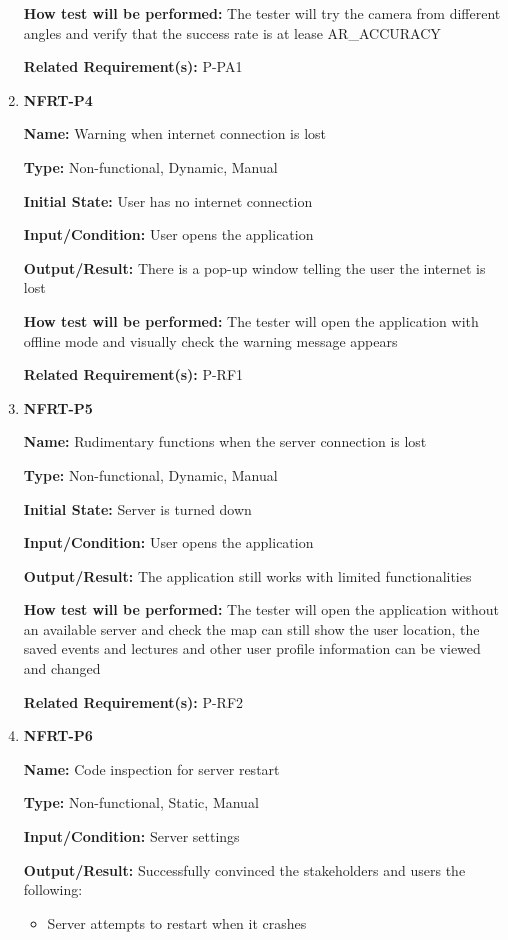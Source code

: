 \documentclass[12pt, titlepage]{article}
\begin{document}
\begin{enumerate}
\textbf{How test will be performed:} The tester will try the camera from different angles and verify that the success rate is at lease AR\_ACCURACY

\textbf{Related Requirement(s):} P-PA1

\item{\textbf{NFRT-P4}}

\textbf{Name:} Warning when internet connection is lost

\textbf{Type:} Non-functional, Dynamic, Manual
					
\textbf{Initial State:} User has no internet connection
					
\textbf{Input/Condition:} User opens the application
					
\textbf{Output/Result:} There is a pop-up window telling the user the internet is lost

\textbf{How test will be performed:} The tester will open the application with offline mode and visually check the warning message appears

\textbf{Related Requirement(s):} P-RF1

\item{\textbf{NFRT-P5}}

\textbf{Name:} Rudimentary functions when the server connection is lost

\textbf{Type:} Non-functional, Dynamic, Manual
					
\textbf{Initial State:} Server is turned down
					
\textbf{Input/Condition:} User opens the application
					
\textbf{Output/Result:} The application still works with limited functionalities

\textbf{How test will be performed:} The tester will open the application without an available server and check the map can still show the user location, the saved events and lectures and other user profile information can be viewed and changed

\textbf{Related Requirement(s):} P-RF2

\item{\textbf{NFRT-P6}}

\textbf{Name:} Code inspection for server restart

\textbf{Type:} Non-functional, Static, Manual
					
\textbf{Input/Condition:} Server settings
					
\textbf{Output/Result:} Successfully convinced the stakeholders and users the following:
\begin{itemize}
\item Server attempts to restart when it crashes
\end{itemize}


\end{enumerate}
\end{document}
